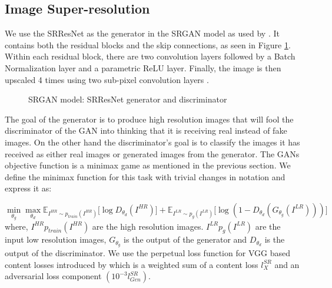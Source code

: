 \documentclass[oneside,a4paper,12pt]{report}
\begin{document}
  \subsection{Image Super-resolution}
\hspace{0.4 in}We use the SRResNet as the generator in the SRGAN model as used by \citet{ledig2017photorealistic}. It contains both the residual blocks and the skip connections, as seen in Figure \ref{fig:srgan-dig}. Within each residual block, there are two convolution layers followed by a Batch Normalization layer and a parametric ReLU layer. Finally, the image is then upscaled 4 times using two sub-pixel convolution layers \citep{shi2016subpixel}.
	\begin{center}
	\begin{figure}[!htbp]
		\centering
	  \caption{SRGAN model: SRResNet generator and discriminator}
	  \label{fig:srgan-dig}
	\end{figure}
  \end{center}
\hspace*{0.25 in}The goal of the generator is to produce high resolution images that will fool the discriminator of the GAN into thinking that it is receiving real instead of fake images. On the other hand the discriminator's goal is to classify the images it has received as either real images or generated images from the generator. The GANs objective function is a minimax game as mentioned in the previous section. We define the minimax function for this task with trivial changes in notation and express it as:

\[
		\min_{\theta_g}\max_{\theta_d}\mathbb{E}_{I^{HR}\sim p_{train}(I^{HR})}\big[ \log D_{\theta_d}(I^{HR})\big] + \mathbb{E}_{I^{LR}\sim p_{g}(I^{LR})}\big[\log(1 - D_{\theta_d}(G_{\theta_g}(I^{LR})))\big]
	\]
	where, $I^{HR}p_{train}(I^{HR})$ are the high resolution images. $I^{LR}p_g(I^{LR})$ are the input low resolution images, $G_{\theta_g}$ is the output of the generator and $D_{\theta_d}$ is the output of the discriminator. We use the perpetual loss function for VGG based content losses introduced by \citet{ledig2017photorealistic} which is a weighted sum of a content loss $l^{SR}_X$ and an adversarial loss component $(10^{-3}l^{SR}_{Gen})$.
\end{document}
